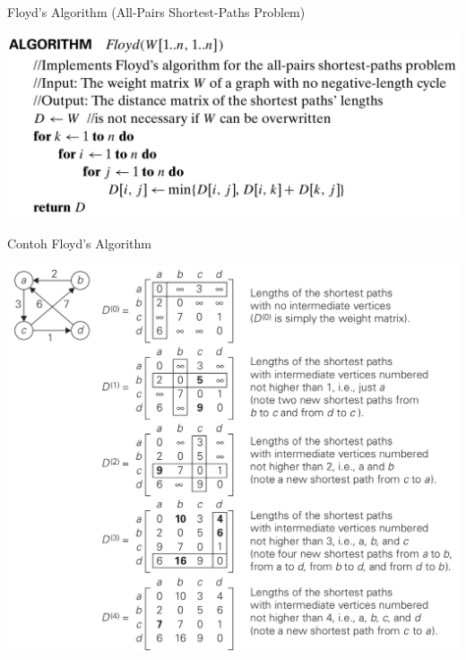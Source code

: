 \documentclass[english,t]{beamer}
\begin{document}
\begin{frame}{Floyd's Algorithm (All-Pairs Shortest-Paths Problem)}
	\begin{center}
		\includegraphics[scale=.21]{images/floyd-algorithm}
	\end{center}
\end{frame}

\begin{frame}{Contoh Floyd's Algorithm}
	\begin{center}
		\includegraphics[scale=.24]{images/floyd-algorithm-example}
	\end{center}
\end{frame}
\end{document}
